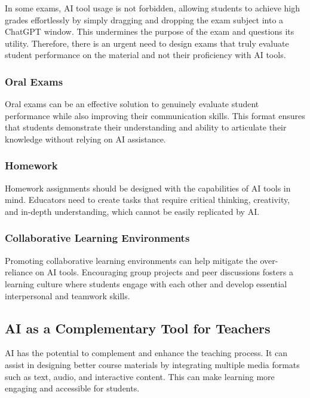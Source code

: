 \documentclass{article}
\begin{document}
In some exams, AI tool usage is not forbidden, allowing students to achieve
high grades effortlessly by simply dragging and dropping the exam subject
into a ChatGPT window. This undermines the purpose of the exam and questions
its utility. Therefore, there is an urgent need to design exams that truly
evaluate student performance on the material and not their proficiency with
AI tools.


\subsubsection{Oral Exams}

Oral exams can be an effective solution to genuinely evaluate student
performance while also improving their communication skills. This format ensures
that students demonstrate their understanding and ability to articulate their
knowledge without relying on AI assistance.

\subsubsection{Homework}

Homework assignments should be designed with the capabilities of AI
tools in mind. Educators need to create tasks that require critical
thinking, creativity, and in-depth understanding, which cannot be
easily replicated by AI.

\subsubsection{Collaborative Learning Environments}

Promoting collaborative learning environments can help mitigate
the over-reliance on AI tools. Encouraging group projects and
peer discussions fosters a learning culture where students engage
with each other and develop essential interpersonal and teamwork skills.

\subsection{AI as a Complementary Tool for Teachers}

AI has the potential to complement and enhance the teaching process.
It can assist in designing better course materials by integrating
multiple media formats such as text, audio, and interactive content.
This can make learning more engaging and accessible for students.
\end{document}
